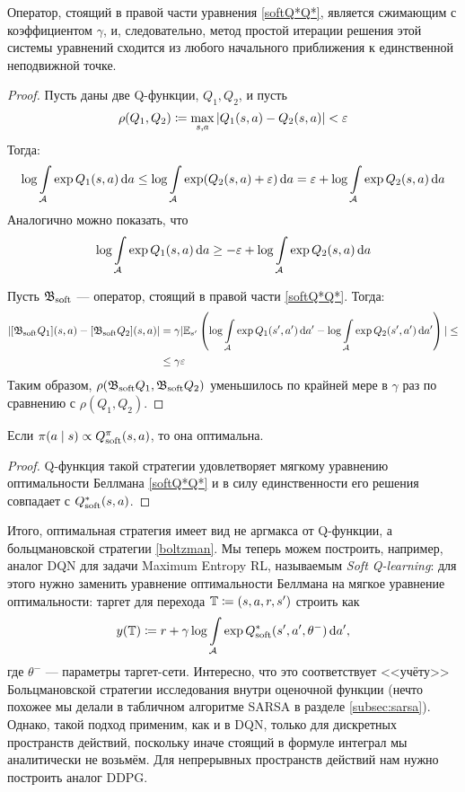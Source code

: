 \begin{theorem}
Оператор, стоящий в правой части уравнения \eqref{softQ*Q*}, является сжимающим с коэффициентом $\gamma$, и, следовательно, метод простой итерации решения этой системы уравнений сходится из любого начального приближения к единственной неподвижной точке.
\begin{proof}
Пусть даны две Q-функции, $Q_1, Q_2$, и пусть 
$$\rho(Q_1, Q_2) \coloneqq \max\limits_{s, a} | Q_1(s, a) \HM- Q_2(s, a) | \HM< \eps$$
Тогда:
$$
\log \int\limits_{\mathcal{A}} \exp Q_1(s, a) \mathop{}\!\mathrm{d} a \le \log \int\limits_{\mathcal{A}} \exp (Q_2(s, a) + \varepsilon) \mathop{}\!\mathrm{d} a = \varepsilon + \log \int\limits_{\mathcal{A}} \exp Q_2(s, a) \mathop{}\!\mathrm{d} a
$$
Аналогично можно показать, что 
$$
\log \int\limits_{\mathcal{A}} \exp Q_1(s, a) \mathop{}\!\mathrm{d} a \ge -\varepsilon + \log \int\limits_{\mathcal{A}} \exp Q_2(s, a) \mathop{}\!\mathrm{d} a
$$

Пусть $\mathfrak{B}_{\mathrm{soft}}$ --- оператор, стоящий в правой части \eqref{softQ*Q*}. Тогда:
\begin{align*}
| [\mathfrak{B}_{\mathrm{soft}} Q_1](s, a) - [\mathfrak{B}_{\mathrm{soft}} Q_2](s, a) | &= \gamma | \mathbb{E}_{s'} \left( \log \int\limits_{\mathcal{A}} \exp Q_1(s', a') \mathop{}\!\mathrm{d} a' - \log \int\limits_{\mathcal{A}} \exp Q_2(s', a') \mathop{}\!\mathrm{d} a' \right) | \le \\ 
&\le \gamma \varepsilon
\end{align*}
Таким образом, $\rho(\mathfrak{B}_{\mathrm{soft}} Q_1, \mathfrak{B}_{\mathrm{soft}} Q_2)$ уменьшилось по крайней мере в $\gamma$ раз по сравнению с $\rho(Q_1, Q_2)$.
\end{proof}
\end{theorem}

\begin{proposition}
Если $\pi(a \mid s) \propto Q^{\pi}_{\mathrm{soft}}(s, a)$, то она оптимальна.
\begin{proof}
Q-функция такой стратегии удовлетворяет мягкому уравнению оптимальности Беллмана \eqref{softQ*Q*} и в силу единственности его решения совпадает с $Q^*_{\mathrm{soft}}(s, a)$.
\end{proof}
\end{proposition}

Итого, оптимальная стратегия имеет вид не аргмакса от Q-функции, а больцмановской стратегии \eqref{boltzman}. Мы теперь можем построить, например, аналог DQN для задачи Maximum Entropy RL, называемым \emph{Soft Q-learning}: для этого нужно заменить уравнение оптимальности Беллмана на мягкое уравнение оптимальности: таргет для перехода $\mathbb{T} \coloneqq (s, a, r, s')$ строить как
$$y(\mathbb{T}) \coloneqq r + \gamma \log \int\limits_{\mathcal{A}} \exp Q^*_{\mathrm{soft}}(s', a', \theta^{-}) \mathop{}\!\mathrm{d} a',$$
где $\theta^{-}$ --- параметры таргет-сети. Интересно, что это соответствует <<учёту>> Больцмановской стратегии исследования внутри оценочной функции (нечто похожее мы делали в табличном алгоритме SARSA в разделе \ref{subsec:sarsa}). Однако, такой подход применим, как и в DQN, только для дискретных пространств действий, поскольку иначе стоящий в формуле интеграл мы аналитически не возьмём. Для непрерывных пространств действий нам нужно построить аналог DDPG.


